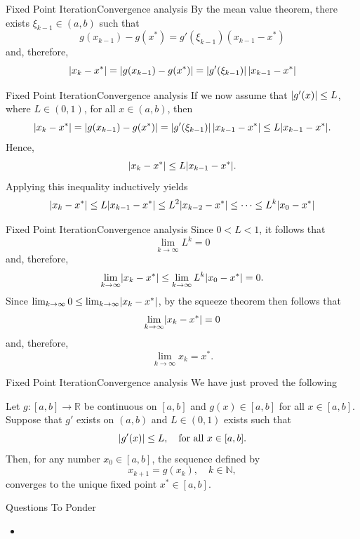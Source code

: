 \documentclass[12pt,aspectratio=169]{beamer}
\DeclarePairedDelimiter{\abs}{\lvert}{\rvert}
\begin{document}
\begin{frame}{Fixed Point Iteration}{Convergence analysis}
  By the mean value theorem, there exists $\xi_{k-1} \in (a,b)$ such that
  \[
    g(x_{k-1}) - g(x^*) = g'(\xi_{k-1})(x_{k-1} - x^*)
  \]
  and, therefore,
  \[
    \abs{x_k - x^*}
    = \abs{g(x_{k-1}) - g(x^*)}
    = \abs*{g'(\xi_{k-1})}\,\abs{x_{k-1} - x^*}
  \]
\end{frame}

\begin{frame}{Fixed Point Iteration}{Convergence analysis}
  If we now assume that $\abs*{g'(x)} \leq L$, where $L \in (0,1)$, for all $x
  \in (a,b)$, then
  \[
    \abs{x_k - x^*}
    = \abs{g(x_{k-1}) - g(x^*)}
    = \abs*{g'(\xi_{k-1})}\,\abs{x_{k-1} - x^*}
    \leq L\abs{x_{k-1} - x^*}.
  \]
  Hence,
  \[
    \abs{x_k - x^*} \leq L\abs{x_{k-1} - x^*}.
  \]
  Applying this inequality inductively yields
  \[
    \abs{x_k - x^*} \leq L\abs{x_{k-1} - x^*}
    \leq L^2\abs{x_{k-2} - x^*}
    \leq \dotsb
    \leq L^k\abs{x_0 - x^*}
  \]
\end{frame}

\begin{frame}{Fixed Point Iteration}{Convergence analysis}
  Since $0 < L < 1$, it follows that
  \[
    \lim_{k\to\infty} L^k = 0
  \]
  and, therefore,
  \[
    \lim_{k\to\infty}\abs{x_k - x^*} \leq \lim_{k\to\infty} L^k\abs{x_0 - x^*}
    = 0.
  \]
  Since $\lim_{k\to\infty} 0 \leq \lim_{k\to\infty}\abs{x_k - x^*}$, by the
  squeeze theorem then follows that
  \[
    \lim_{k\to\infty} \abs{x_k - x^*} = 0
  \]
  and, therefore,
  \[
    \lim_{k\to\infty} x_k = x^*.
  \]
\end{frame}

\begin{frame}{Fixed Point Iteration}{Convergence analysis}
  We have just proved the following
  \begin{theorem}
    Let $g : [a,b] \to \mathbb{R}$ be continuous on $[a,b]$ and $g(x) \in [a,b]$
    for all $x \in [a,b]$.
    Suppose that $g'$ exists on $(a,b)$ and $L \in (0,1)$ exists such that
    \[
      \abs{g'(x)} \leq L,
      \quad\text{for all}\ x \in [a,b].
    \]
    Then, for any number $x_0 \in [a,b]$, the sequence defined by
    \[
      x_{k+1} = g(x_k), \quad k \in \mathbb{N},
    \]
    converges to the unique fixed point $x^* \in [a,b]$.
  \end{theorem}
\end{frame}

\begin{frame}{Questions To Ponder}
  \begin{itemize}
    \item   
  \end{itemize}
\end{frame}
\end{document}
